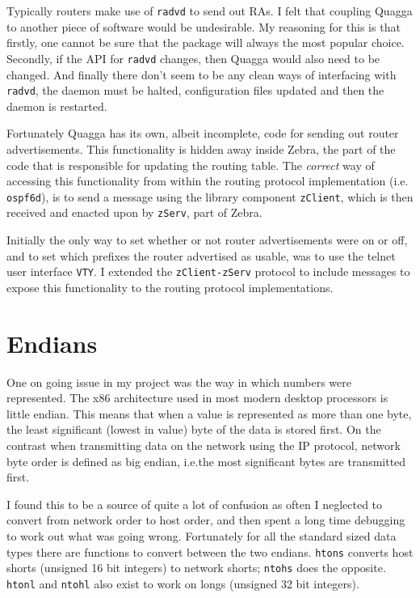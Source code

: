 \documentclass[12pt]{report}
\begin{document}
Typically routers make use of \texttt{radvd}  to send out RAs. I felt that coupling Quagga to another
piece of software would be undesirable. My reasoning for this is that firstly,
one cannot be sure that the package will always the most popular choice.
Secondly, if the API for \texttt{radvd} changes, then Quagga would also need to be
changed. And finally there don't seem to be any clean ways of interfacing with
\texttt{radvd}, the daemon must be halted, configuration files updated and then the
daemon is restarted.

Fortunately Quagga has its own, albeit incomplete, code for sending out router
advertisements.  This functionality is hidden away inside Zebra, the part of
the code that is responsible for updating the routing table. The \emph{correct}
way of accessing this functionality from within the routing protocol
implementation (i.e.  \texttt{ospf6d}), is to send a message using the library
component \texttt{zClient}, which is then received and enacted upon by
\texttt{zServ}, part of Zebra. 

Initially the only way to set whether or not router advertisements were on or
off, and to set which prefixes the router advertised as usable, was to use the
telnet user interface \texttt{VTY}. I extended the \texttt{zClient-zServ}
protocol to include messages to expose this functionality to the routing
protocol implementations. 

\section{Endians}
One on going issue in my project was the way in which numbers were represented.
The x86 architecture used in most modern desktop processors is little endian.
This means that when a value is represented as more than one byte, the least
significant (lowest in value) byte of the data is stored first. On the contrast
when transmitting data on the network using the IP protocol, network byte order
is defined as big endian, i.e.\@ the most significant bytes are transmitted
first. 

I found this to be a source of quite a lot of confusion as often I neglected to
convert from network order to host order, and then spent a long time debugging
to work out what was going wrong. Fortunately for all the standard sized data
types there are functions to convert between the two endians. \texttt{htons}
converts host shorts (unsigned 16 bit integers) to network shorts;
\texttt{ntohs} does the opposite. \texttt{htonl} and \texttt{ntohl} also exist
to work on longs (unsigned 32 bit integers). 
\end{document}
